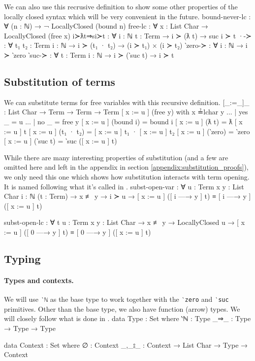 \documentclass[logo,bsc,singlespacing,parskip,online]{infthesis}
\renewenvironment{code}{\mintedcopy[breaklines,breaksymbolleft=\;]{agda}}{\endmintedcopy}
\begin{document}
We can also use this recrusive definition to show some other properties of the locally closed syntax
which will be very convenient in the future.
\begin{code}
bound-never-lc : ∀ (n : ℕ) → ¬ LocallyClosed (bound n)
free-lc : ∀ {x : List Char} → LocallyClosed (free x)
i≻ƛt⇒si≻t : ∀ {i : ℕ} {t : Term} → i ≻ (ƛ t) → suc i ≻ t
·-≻ : ∀ {t₁ t₂ : Term} {i : ℕ} → i ≻ (t₁ · t₂) → (i ≻ t₁) × (i ≻ t₂)
‵zero-≻ : ∀ {i : ℕ} → i ≻ ‵zero
‵suc-≻ : ∀ {t : Term} {i : ℕ} → i ≻ (‵suc t) → i ≻ t
\end{code}

\subsection{Substitution of terms}
We can substitute terms for free variables with this recursive definition.
\begin{code}
[_:=_]_ : List Char → Term → Term → Term
[ x := u ] (free y) with x ≟lchar y
... | yes _ = u
... | no  _ = free y
[ x := u ] (bound i) = bound i
[ x := u ] (ƛ t) = ƛ [ x := u ] t
[ x := u ] (t₁ · t₂) = [ x := u ] t₁ · [ x := u ] t₂
[ x := u ] (‵zero) = ‵zero
[ x := u ] (‵suc t) = ‵suc ([ x := u ] t)
\end{code}

While there are many interesting properties of substitution (and a few are omitted here and left in
the appendix in section \ref{appendix:substitution_proofs}), we only need this one which shows how
substitution interacts with term opening. It is named following what it's called in
\citet{chargueraud_locally_2012}.
\begin{code}
subst-open-var : ∀ {u : Term} {x y : List Char} {i : ℕ} (t : Term)
  → x ≢ y
  → i ≻ u
  → [ x := u ] ([ i —→ y ] t) ≡ [ i —→ y ] ([ x := u ] t)

subst-open-lc : ∀ {t u : Term} {x y : List Char}
  → x ≢ y
  → LocallyClosed u
  → [ x := u ] ([ 0 —→ y ] t) ≡ [ 0 —→ y ] ([ x := u ] t)
\end{code}

\subsection{Typing}
\label{section:typing_stlc}
\paragraph*{Types and contexts.} We will use \texttt{‵ℕ} as the base type to work together with the
\texttt{‵zero} and \texttt{‵suc} primitives. Other than the base type, we also have function (arrow)
types. We will closely follow what is done in \citet{wadler_programming_2022}.
\begin{code}
data Type : Set where
  ‵ℕ : Type
  _⇒_ : Type → Type → Type

data Context : Set where
  ∅ : Context
  _,_⦂_ : Context → List Char → Type → Context
\end{code}
\end{document}
